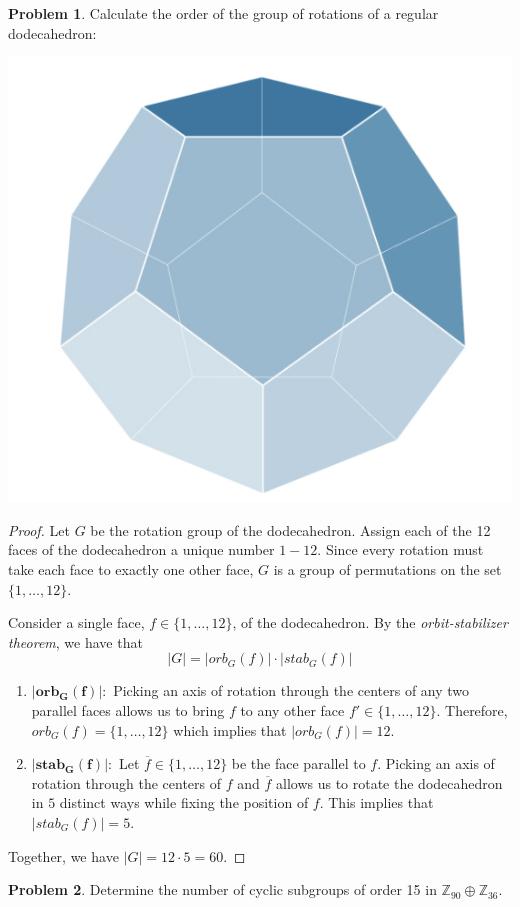 \documentclass[12pt,reqno]{article}
\theoremstyle{plain}
\theoremstyle{definition}
\newtheorem{problem}{Problem}
\begin{document}
\begin{problem} 
    Calculate the order of the group of rotations of a regular dodecahedron:
    \begin{center}
        \includegraphics[height = 1.6 in]{Screenshot 2023-03-03 at 1.12.39 PM.png}
    \end{center}
\end{problem}

\begin{proof}
    Let \(G\) be the rotation group of the dodecahedron. Assign each of the 12 faces of the dodecahedron a unique number \(1-12\).
    Since every rotation must take each face to exactly one other face, \(G\) is a group of permutations
    on the set \(\{1,\ldots,12\}\). 
    
    Consider a single face, \(f\in\{1,\ldots,12\}\), of the dodecahedron.
    By the \emph{orbit-stabilizer theorem}, we have that 
    \[|G|=|orb_G(f)|\cdot |stab_G(f)|\]
    \begin{enumerate}
        \item \(\mathbf{|orb_G(f)|}:\) Picking an axis of rotation through the centers of any two
        parallel faces allows us to bring \(f\) to any other face \(f'\in\{1,\ldots,12\}\).
        Therefore, \(orb_G(f)=\{1,\ldots,12\}\) which implies that \(|orb_G(f)|=12\).
        \item \(\mathbf{|stab_G(f)|}:\) Let \(\overline{f}\in \{1,\ldots,12\}\) be the face parallel to \(f\). 
        Picking an axis of rotation through the centers of \(f\) and \(\overline{f}\) allows
        us to rotate the dodecahedron in \(5\) distinct ways while fixing the position of \(f\). 
        This implies that \(|stab_G(f)|=5\).
    \end{enumerate}
    Together, we have \(|G|=12\cdot 5=60\).
\end{proof}

\newpage
    

\begin{problem} 
    Determine the number of cyclic subgroups of order 15 in $\mathbb{Z}_{90} \oplus \mathbb{Z}_{36}$.
\end{problem}
\end{document}
